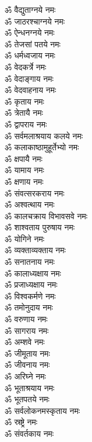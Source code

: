 \begin{multicols}{2}
\begin{flushleft}
        ॐ वैद्युताग्नये नमः\\
        ॐ जाठरश्चाग्नये नमः\\
        ॐ ऐन्धनग्नये नमः\hfill{}\\
        ॐ तेजसां पतये नमः\\
        ॐ धर्मध्वजाय नमः\\
        ॐ वेदकर्त्रे नमः\\
        ॐ वेदाङ्गाय नमः\\
        ॐ वेदवाहनाय नमः\\
        ॐ कृताय नमः\\
        ॐ त्रेतायै नमः\\
        ॐ द्वापराय नमः\\
        ॐ सर्वमलाश्रयाय कलये नमः\\
        ॐ कलाकाष्ठामुहूर्तेभ्यो नमः\hfill{}\\
        ॐ क्षपायै नमः\\
        ॐ यामाय नमः\\
        ॐ क्षणाय नमः\\
        ॐ संवत्सरकराय नमः\\
        ॐ अश्वत्थाय नमः\\
        ॐ कालचक्राय विभावसवे नमः\\
        ॐ शाश्वताय पुरुषाय नमः\\
        ॐ योगिने नमः\\
        ॐ व्यक्ताव्यक्ताय नमः\\
        ॐ सनातनाय नमः\hfill{}\\
        ॐ कालाध्यक्षाय नमः\\
        ॐ प्रजाध्यक्षाय नमः\\
        ॐ विश्वकर्मणे नमः\\
        ॐ तमोनुदाय नमः\\
        ॐ वरुणाय नमः\\
        ॐ सागराय नमः\\
        ॐ अम्शवे नमः\\
        ॐ जीमूताय नमः\\
        ॐ जीवनाय नमः\\
        ॐ अरिघ्ने नमः\hfill{}\\
        ॐ भूताश्रयाय नमः\\
        ॐ भूतपतये नमः\\
        ॐ सर्वलोकनमस्कृताय नमः\\
        ॐ स्रष्ट्रे नमः\\
        ॐ संवर्तकाय नमः\\

\end{flushleft}
\end{multicols}
